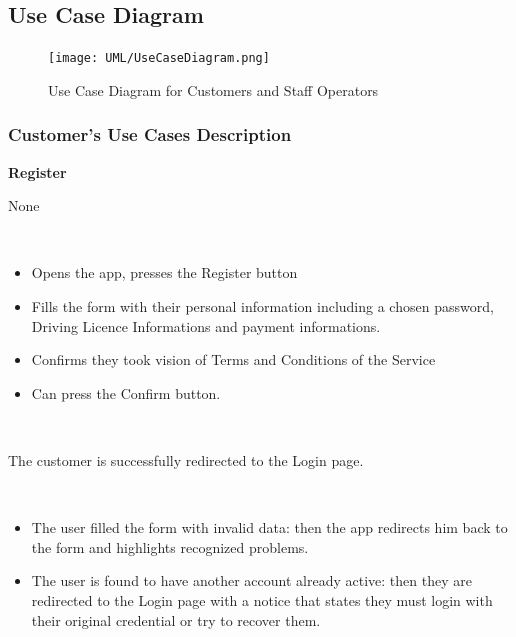 \documentclass[11pt]{article} %
\begin{document}
\subsection{Use Case Diagram}
\begin{figure}[H]
	\centering
	\texttt{[image: UML/UseCaseDiagram.png]}
	\caption{Use Case Diagram for Customers and Staff Operators}
\end{figure}

\subsubsection{Customer's Use Cases Description}


\begin{description}[noitemsep,topsep=0pt,parsep=0pt,partopsep=0pt]
	\item[Name:] \textbf{Register}
	\item[Entry Conditions:] None
	\item[Flow Of Events:] \hfill\
	\begin{itemize}
		\item Opens the app, presses the Register button
		\item Fills the form with their personal information including a chosen password, Driving Licence Informations and payment informations.
		\item Confirms they took vision of Terms and Conditions of the Service 
		\item Can press the Confirm button.
	\end{itemize} \hfill\
	\item[Exit conditions:] The customer is successfully redirected to the Login page.
	\item[Exceptions:]  \hfill\
	\begin{itemize}
		\item The user filled the form with invalid data: then the app redirects him back to the form and highlights recognized problems. 
		\item The user is found to have another account already active: then they are redirected to the Login 	page with a notice that states they must login with their original credential or try to recover them.
	\end{itemize}
\end{description}
\end{document}
